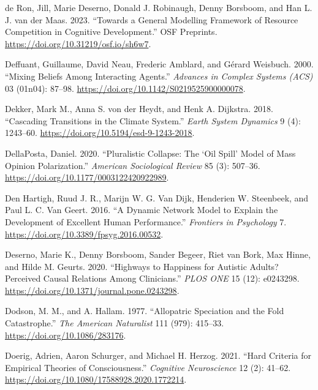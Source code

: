 \documentclass[
  a4paper,
  DIV=11,
  numbers=noendperiod,
  oneside]{scrreprt}
\newlength{\cslhangindent}
\newenvironment{CSLReferences}[2] %
 {\begin{list}{}{%
  \setlength{\itemindent}{0pt}
  \setlength{\leftmargin}{0pt}
  \setlength{\parsep}{0pt}
  \ifodd #1
   \setlength{\leftmargin}{\cslhangindent}
   \setlength{\itemindent}{-1\cslhangindent}
  \fi
  \setlength{\itemsep}{#2\baselineskip}}}
 {\end{list}}
\begin{document}
\begin{CSLReferences}{1}{0}
de Ron, Jill, Marie Deserno, Donald J. Robinaugh, Denny Borsboom, and
Han L. J. van der Maas. 2023. {``Towards a {General Modelling Framework}
of {Resource Competition} in {Cognitive Development}.''} {OSF
Preprints}. \url{https://doi.org/10.31219/osf.io/sh6w7}.

Deffuant, Guillaume, David Neau, Frederic Amblard, and Gérard Weisbuch.
2000. {``Mixing Beliefs Among Interacting Agents.''} \emph{Advances in
Complex Systems (ACS)} 03 (01n04): 87--98.
\url{https://doi.org/10.1142/S0219525900000078}.

Dekker, Mark M., Anna S. von der Heydt, and Henk A. Dijkstra. 2018.
{``Cascading Transitions in the Climate System.''} \emph{Earth System
Dynamics} 9 (4): 1243--60.
\url{https://doi.org/10.5194/esd-9-1243-2018}.

DellaPosta, Daniel. 2020. {``Pluralistic {Collapse}: {The} {`{Oil
Spill}'} {Model} of {Mass Opinion Polarization}.''} \emph{American
Sociological Review} 85 (3): 507--36.
\url{https://doi.org/10.1177/0003122420922989}.

Den Hartigh, Ruud J. R., Marijn W. G. Van Dijk, Henderien W. Steenbeek,
and Paul L. C. Van Geert. 2016. {``A {Dynamic Network Model} to
{Explain} the {Development} of {Excellent Human Performance}.''}
\emph{Frontiers in Psychology} 7.
\url{https://doi.org/10.3389/fpsyg.2016.00532}.

Deserno, Marie K., Denny Borsboom, Sander Begeer, Riet van Bork, Max
Hinne, and Hilde M. Geurts. 2020. {``Highways to Happiness for Autistic
Adults? {Perceived} Causal Relations Among Clinicians.''} \emph{PLOS
ONE} 15 (12): e0243298.
\url{https://doi.org/10.1371/journal.pone.0243298}.

Dodson, M. M., and A. Hallam. 1977. {``Allopatric {Speciation} and the
{Fold Catastrophe}.''} \emph{The American Naturalist} 111 (979):
415--33. \url{https://doi.org/10.1086/283176}.

Doerig, Adrien, Aaron Schurger, and Michael H. Herzog. 2021. {``Hard
Criteria for Empirical Theories of Consciousness.''} \emph{Cognitive
Neuroscience} 12 (2): 41--62.
\url{https://doi.org/10.1080/17588928.2020.1772214}.


\end{CSLReferences}
\end{document}
